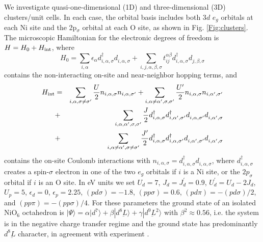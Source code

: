 \documentclass[showpacs,preprintnumbers,amsmath,amssymb,prl,aps,twocolumn,superscriptaddress]{revtex4}
\newcommand{\ligand}{{\underbar L}}
\begin{document}
We investigate quasi-one-dimensional (1D) 
and three-dimensional (3D) clusters/unit cells.
In each case, the orbital basis includes  
both 3$d$ $e_g$ orbitals at each Ni site and the 2p$_\sigma$ 
orbital at each O site, as shown in Fig. \ref{Fig:clusters}. 
The microscopic Hamiltonian for the electronic degrees of freedom 
is $H = H_{\rm 0} + H_{\rm int}$, where 
\begin{equation*}
    H_{\mathrm 0} = \sum_{i,\alpha} \epsilon_\alpha 
    d^\dagger_{i,\alpha,\sigma}d^{\phantom\dagger}_{i,\alpha,\sigma}
    +\sum_{i,j,\alpha,\beta,\sigma} t^{\alpha\beta}_{ij} 
    d^\dagger_{i,\alpha,\sigma}d^{\phantom\dagger}_{j,\beta,\sigma}
\end{equation*}
contains the non-interacting on-site and near-neighbor hopping terms, and 
\begin{eqnarray*}
H_{\rm {int}}&=&\sum_{i,\alpha,\sigma\ne\sigma^\prime} \frac{U}{2} n_{i,\alpha,\sigma}n_{i,\alpha,\sigma^\prime} 
+ \sum_{i,\alpha\ne\alpha^\prime,\sigma,\sigma^\prime}\frac{U^\prime}{2} 
 n_{i,\alpha,\sigma}n_{i,\alpha^\prime,\sigma^\prime} \\
&+&\sum_{i,\alpha,\alpha^\prime,\sigma,\sigma^\prime} \frac{J}{2}
d^\dagger_{i,\alpha,\sigma}d^\dagger_{i,\alpha^\prime,\sigma^\prime}
d^{\phantom\dagger}_{i,\alpha,\sigma^\prime}d^{\phantom\dagger}_{i,\alpha^\prime,\sigma}\\
&+&\sum_{i,\alpha\ne\alpha^\prime,\sigma\ne\sigma^\prime} \frac{J^\prime}{2}
d^\dagger_{i,\alpha,\sigma}d^\dagger_{i,\alpha,\sigma^\prime}
d^{\phantom\dagger}_{i,\alpha^\prime,\sigma^\prime}d^{\phantom\dagger}_{i,\alpha^\prime,\sigma}
\end{eqnarray*}
contains the on-site Coulomb interactions with 
$n_{i,\alpha,\sigma} =
d^\dagger_{i,\alpha,\sigma}d^{\phantom\dagger}_{i,\alpha,\sigma}$,
where $ d^\dagger_{i,\alpha,\sigma}$ creates a spin-$\sigma$ electron
in one of the two $e_g$ orbitals if $i$ is a Ni site, or the
$2p_\sigma$ orbital if $i$ is an O site. In eV units we set 
$U_d = 7$, $J_d = J^\prime_d = 0.9$, $U_d^\prime = U_d - 2J_d$, 
$U_p = 5$, $\epsilon_d = 0$, $\epsilon_p = 2.25$, $(pd\sigma) = -1.8$, 
$(pp\sigma) = 0.6$, $(pd\pi) = -(pd\sigma)/2$, and $(pp\pi) = -(pp\sigma)/4$. 
For these parameters the  ground state of
an isolated NiO$_6$ octahedron is
$|\Psi\rangle = \alpha |d^7\rangle
+\beta|d^8\ligand\rangle + \gamma|d^9\ligand^2\rangle$ with 
$\beta^2 \approx 0.56$, i.e. the system is in the negative 
charge transfer regime and the ground state has
predominantly $d^8\ligand$  character, in agreement with 
experiment \cite{MizokawaPRB1995,AbbatePRB2002,HoribePRB2007,Bodenthin2011}.  
\end{document}
